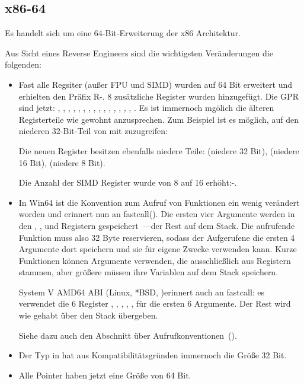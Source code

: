 
\subsection{x86-64}
\label{x86-64}
Es handelt sich um eine 64-Bit-Erweiterung der x86 Architektur.

Aus Sicht eines Reverse Engineers sind die wichtigsten Veränderungen die folgenden:

\myindex{\CLanguageElements!\Pointers}
\begin{itemize}

\item
Fast alle Regsiter (außer FPU und SIMD) wurden auf 64 Bit erweitert und erhielten den Präfix R-. 8 zusätzliche Register
wurden hinzugefügt.
Die \ac{GPR} sind jetzt: \RAX, \RBX, \RCX, \RDX, 
\RBP, \RSP, \RSI, \RDI, , , , 
, , , , . 
Es ist immernoch mgölich die älteren Registerteile wie gewohnt anzusprechen.
Zum Beispiel ist es möglich, auf den niederen 32-Bit-Teil von \RAX mit \EAX zuzugreifen:

Die neuen  Register besitzen ebenfalls niedere Teile:  (niedere 32 Bit),
 (niedere 16 Bit),  (niedere 8 Bit).

Die Anzahl der SIMD Register wurde von 8 auf 16 erhöht:-.

\item
In Win64 ist die Konvention zum Aufruf von Funktionen ein wenig verändert worden und erinnert nun an
fastcall(). Die ersten vier Argumente werden in den \RCX, \RDX,  und  Registern
gespeichert~---der Rest auf dem Stack.
Die aufrufende Funktion muss also 32 Byte reservieren, sodass der Aufgerufene die ersten 4 Argumente dort speichern 
und sie für eigene Zwecke verwenden kann.
Kurze Funktionen können Argumente verwenden, die ausschließlich aus Registern stammen, aber größere müssen ihre
Variablen auf dem Stack speichern.

System V AMD64 ABI (Linux, *BSD, \MacOSX)\SysVABI erinnert auch an
fastcall: es verwendet die 6 Register 
\RDI, \RSI, \RDX, \RCX, ,  für die ersten 6 Argumente.
Der Rest wird wie gehabt über den Stack übergeben.

Siehe dazu auch den Abschnitt über Aufrufkonventionen~().

\item
Der Typ \Tint in \CCpp hat aus Kompatibilitätsgründen immernoch die Größe 32 Bit.

\item
Alle Pointer haben jetzt eine Größe von 64 Bit.

\end{itemize}

